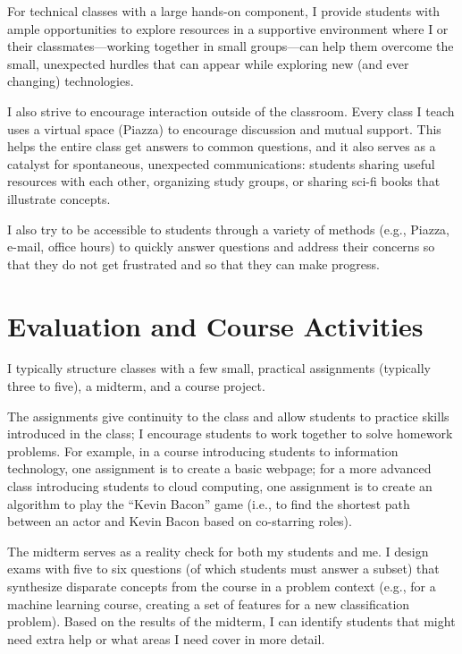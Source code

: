 \documentclass[11pt]{amsart}
\begin{document}
For technical classes with a large hands-on component, I provide
students with ample opportunities to explore resources in a supportive
environment where I or their classmates---working together in small
groups---can help them overcome the small, unexpected hurdles that can
appear while exploring new (and ever changing) technologies.

I also strive to encourage interaction outside of the classroom.  Every class I
teach uses a virtual space (Piazza) to encourage discussion and mutual support.  This
helps the entire class get answers to common questions, and it also serves as a
catalyst for spontaneous, unexpected communications: students sharing useful
resources with each other, organizing study groups, or sharing sci-fi books that
illustrate concepts.

I also try to be accessible to students through a variety of methods (e.g.,
Piazza, e-mail, office hours) to quickly answer questions and address their
concerns so that they do not get frustrated and so that they can make progress.

\section{Evaluation and Course Activities}

I typically structure classes with a few small, practical assignments (typically
three to five), a midterm, and a course project.

The assignments give continuity to the class and allow students to practice
skills introduced in the class; I encourage students to work together to solve
homework problems.  For example, in a course introducing students to information
technology, one assignment is to create a basic webpage; for a more advanced
class introducing students to cloud computing, one assignment is to create an
algorithm to play the ``Kevin Bacon'' game (i.e., to find the shortest path
between an actor and Kevin Bacon based on co-starring roles).

The midterm serves as a reality check for both my students and me.  I design
exams with five to six questions (of which students must answer a subset) that
synthesize disparate concepts from the course in a problem context (e.g., for a
machine learning course, creating a set of features for a new classification
problem).  Based on the results of the midterm, I can identify students that
might need extra help or what areas I need cover in more detail.
\end{document}
